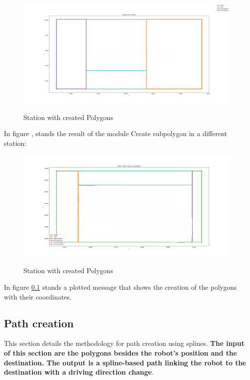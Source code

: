 \begin{figure}[H]
    \begin{center}
        \includegraphics[width=5in]{images/Chap2/Polygons_created.png}\\
        \caption{Station with created Polygons}
        \label{Station polygon}
        \end{center}    
\end{figure}

In figure , stands the result of the module Create subpolygon in a different station:
\begin{figure}[H]
    \begin{center}
        \includegraphics[width=5in]{images/Chap2/Other_station.png}\\
        \caption{Station with created Polygons}
        \label{other station}
        \end{center}    
\end{figure}
In figure \ref{} stands a plotted message that shows the creation of the polygons with their coordinates.

\subsection{Path creation}
This section details the methodology for path creation using splines. \textbf{The input of this section are the polygons besides
the robot's position and the destination. The output is a spline-based path linking the robot to the destination with a 
driving direction change}.

